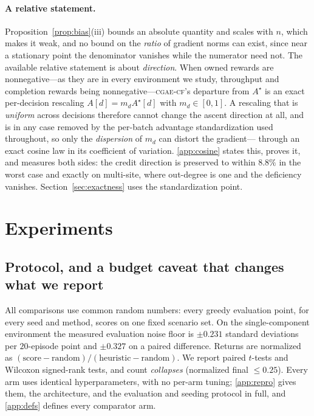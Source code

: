 \documentclass[review,authoryear,3p,times]{elsarticle}
\newcommand{\cflow}{\textsc{cgae-cf}}          %
\begin{document}
\paragraph{A relative statement.} Proposition~\ref{prop:bias}(iii) bounds an
absolute quantity and scales with $n$, which makes it weak, and no bound on the
\emph{ratio} of gradient norms can exist, since near a stationary point the
denominator vanishes while the numerator need not. The available relative
statement is about \emph{direction}. When owned rewards are nonnegative---as
they are in every environment we study, throughput and completion rewards being
nonnegative---\cflow's departure from $A^{\star}$ is an exact per-decision
rescaling $A[d]=m_d A^{\star}[d]$ with $m_d\in[0,1]$. A rescaling that is
\emph{uniform} across decisions therefore cannot change the ascent direction at
all, and is in any case removed by the per-batch advantage standardization used
throughout, so only the \emph{dispersion} of $m_d$ can distort the gradient---
through an exact cosine law in its coefficient of variation.
\ref{app:cosine} states this, proves it, and measures both sides: the
credit direction is preserved to within $8.8\%$ in the worst case and exactly
on multi-site, where out-degree is one and the deficiency vanishes.
Section~\ref{sec:exactness} uses the standardization point.

\section{Experiments}
\label{sec:exp}

\subsection{Protocol, and a budget caveat that changes what we report}

All comparisons use common random numbers: every greedy evaluation point, for
every seed and method, scores on one fixed scenario set. On the single-component
environment the measured evaluation noise floor is $\pm 0.231$ standard
deviations per $20$-episode point and $\pm 0.327$ on a paired difference.
Returns are normalized as $(\text{score}-\text{random})/
(\text{heuristic}-\text{random})$. We report paired $t$-tests and Wilcoxon
signed-rank tests, and count \emph{collapses} (normalized final $\le 0.25$).
Every arm uses identical hyperparameters, with no per-arm tuning;
\ref{app:repro} gives them, the architecture, and the evaluation and
seeding protocol in full, and \ref{app:defs} defines every comparator
arm.
\end{document}
